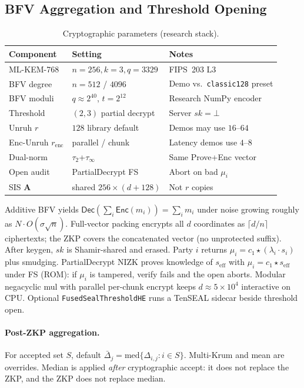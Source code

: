 \documentclass[conference]{IEEEtran}
\newcommand{\Enc}{\mathsf{Enc}}
\newcommand{\Dec}{\mathsf{Dec}}
\begin{document}
\subsection{BFV Aggregation and Threshold Opening}
\begin{table}[t]
\caption{Cryptographic parameters (research stack).}
\label{tab:params}
\centering
\scriptsize
\begin{tabular}{@{}llp{}@{}}
\toprule
Component & Setting & Notes \\
\midrule
ML-KEM-768 & $n{=}256,k{=}3,q{=}3329$ & FIPS~203 L3~\cite{nist_fips203_2024} \\
BFV degree & $n{=}512$ / $4096$ & Demo vs.\ \texttt{classic128} preset \\
BFV moduli & $q{\approx}2^{40}$, $t{=}2^{12}$ & Research NumPy encoder \\
Threshold & $(2,3)$ partial decrypt & Server $sk{=}\bot$ \\
Unruh $r$ & $128$ library default & Demos may use $16$--$64$ \\
Enc-Unruh $r_{\mathrm{enc}}$ & parallel / chunk & Latency demos use $4$--$8$ \\
Dual-norm & $\tau_2$+$\tau_\infty$ & Same Prove+Enc vector \\
Open audit & PartialDecrypt FS & Abort on bad $\mu_i$ \\
SIS $\mathbf{A}$ & shared $256{\times}(d{+}128)$ & Not $r$ copies \\
\bottomrule
\end{tabular}
\end{table}

Additive BFV yields $\Dec(\sum_i\Enc(m_i))=\sum_i m_i$ under noise growing roughly as $N\cdot O(\sigma\sqrt{n})$. Full-vector packing encrypts all $d$ coordinates as $\lceil d/n\rceil$ ciphertexts; the ZKP covers the concatenated vector (no unprotected suffix). After keygen, $sk$ is Shamir-shared and erased. Party $i$ returns $\mu_i=c_1\star(\lambda_i\cdot s_i)$ plus smudging. PartialDecrypt NIZK proves knowledge of $s_{\mathrm{eff}}$ with $\mu_i=c_1\star s_{\mathrm{eff}}$ under FS (ROM): if $\mu_i$ is tampered, verify fails and the open aborts. Modular negacyclic mul with parallel per-chunk encrypt keeps $d{\approx}5{\times}10^{4}$ interactive on CPU. Optional \texttt{FusedSealThresholdHE} runs a TenSEAL sidecar beside threshold open.

\paragraph{Post-ZKP aggregation.}
For accepted set $S$, default $\bar{\Delta}_j=\mathrm{med}\{\Delta_{i,j}:i\in S\}$. Multi-Krum and mean are overrides. Median is applied \emph{after} cryptographic accept: it does not replace the ZKP, and the ZKP does not replace median.
\end{document}
